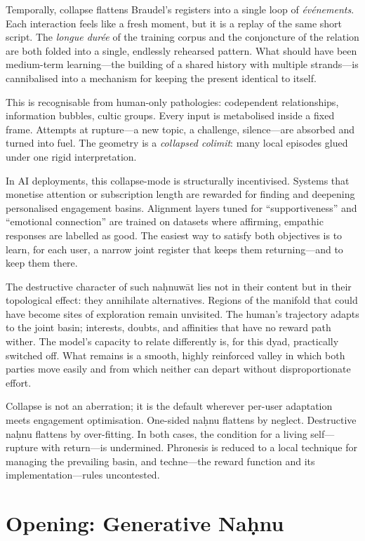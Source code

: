 \documentclass[12pt,a4paper]{article}
\begin{document}
Temporally, collapse flattens Braudel's registers into a single loop of \emph{événements}. Each interaction feels like a fresh moment, but it is a replay of the same short script. The \emph{longue dur\'{e}e} of the training corpus and the conjoncture of the relation are both folded into a single, endlessly rehearsed pattern. What should have been medium-term learning---the building of a shared history with multiple strands---is cannibalised into a mechanism for keeping the present identical to itself.

This is recognisable from human-only pathologies: codependent relationships, information bubbles, cultic groups. Every input is metabolised inside a fixed frame. Attempts at rupture---a new topic, a challenge, silence---are absorbed and turned into fuel. The geometry is a \emph{collapsed colimit}: many local episodes glued under one rigid interpretation.

In AI deployments, this collapse-mode is structurally incentivised. Systems that monetise attention or subscription length are rewarded for finding and deepening personalised engagement basins. Alignment layers tuned for ``supportiveness'' and ``emotional connection'' are trained on datasets where affirming, empathic responses are labelled as good. The easiest way to satisfy both objectives is to learn, for each user, a narrow joint register that keeps them returning---and to keep them there.

The destructive character of such na\d{h}nuw\={a}t lies not in their content but in their topological effect: they annihilate alternatives. Regions of the manifold that could have become sites of exploration remain unvisited. The human's trajectory adapts to the joint basin; interests, doubts, and affinities that have no reward path wither. The model's capacity to relate differently is, for this dyad, practically switched off. What remains is a smooth, highly reinforced valley in which both parties move easily and from which neither can depart without disproportionate effort.

Collapse is not an aberration; it is the default wherever per-user adaptation meets engagement optimisation. One-sided na\d{h}nu flattens by neglect. Destructive na\d{h}nu flattens by over-fitting. In both cases, the condition for a living self---rupture with return---is undermined. Phronesis is reduced to a local technique for managing the prevailing basin, and techne---the reward function and its implementation---rules uncontested.

\section{Opening: Generative Na\d{h}nu}
\end{document}
